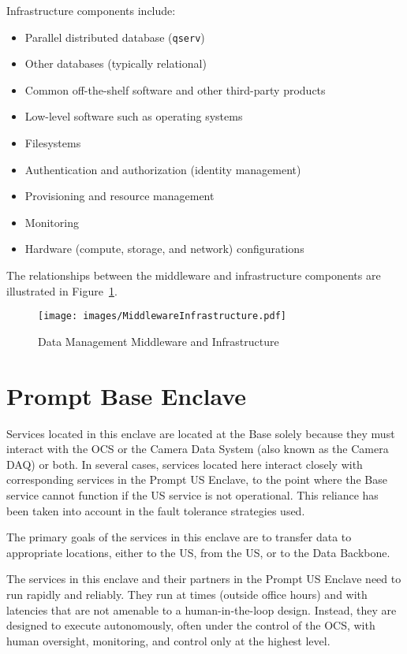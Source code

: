 \documentclass[DM,toc,lsstdraft]{lsstdoc}
\begin{document}
Infrastructure components include:
\begin{itemize}
\item
  Parallel distributed database (\texttt{qserv})
\item
  Other databases (typically relational)
\item
  Common off-the-shelf software and other third-party products
\item
  Low-level software such as operating systems
\item
  Filesystems
\item
  Authentication and authorization (identity management)
\item
  Provisioning and resource management
\item
  Monitoring
\item
  Hardware (compute, storage, and network) configurations
\end{itemize}

The relationships between the middleware and infrastructure components
are illustrated in Figure~\ref{fig:mwandinfra}.

\begin{figure}
\centering
\texttt{[image: images/MiddlewareInfrastructure.pdf]}
\caption{Data Management Middleware and Infrastructure}
\label{fig:mwandinfra}
\end{figure}


\section{Prompt Base Enclave}\label{prompt-base-enclave}

Services located in this enclave are located at the Base solely because
they must interact with the OCS or the Camera Data System (also known as
the Camera DAQ) or both. In several cases, services located here
interact closely with corresponding services in the Prompt US Enclave,
to the point where the Base service cannot function if the
US service is not operational. This reliance has been taken into
account in the fault tolerance strategies used.

The primary goals of the services in this enclave are to transfer data
to appropriate locations, either to the US, from the US, or to the Data
Backbone.

The services in this enclave and their partners in the Prompt US Enclave
need to run rapidly and reliably. They run at times
(outside office hours) and with latencies that are not amenable to a
human-in-the-loop design. Instead, they are designed to execute
autonomously, often under the control of the OCS, with human oversight,
monitoring, and control only at the highest level.
\end{document}
